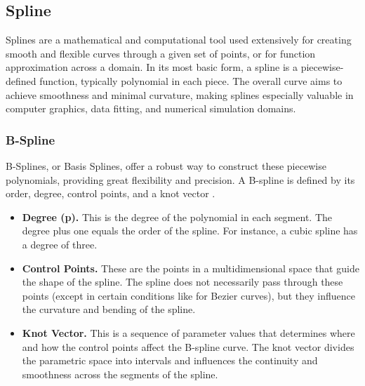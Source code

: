 \subsection{Spline}
Splines are a mathematical and computational tool used extensively for creating smooth and flexible curves through a given set of points, or for function approximation across a domain. In its most basic form, a spline is a piecewise-defined function, typically polynomial in each piece. The overall curve aims to achieve smoothness and minimal curvature, making splines especially valuable in computer graphics, data fitting, and numerical simulation domains.

\subsubsection{B-Spline}

B-Splines, or Basis Splines, offer a robust way to construct these piecewise polynomials,
providing great flexibility and precision.
A B-spline is defined by its order, degree, control points, and a knot vector \cite{allaire2008numerical}.
\begin{itemize}
\item \textbf{Degree (p).} This is the degree of the polynomial in each segment.
    The degree plus one equals the order of the spline.
    For instance, a cubic spline has a degree of three.
\item \textbf{Control Points.} These are the points in a multidimensional space that guide the shape of the spline.
    The spline does not necessarily pass through these points (except in certain conditions like for Bezier curves),
    but they influence the curvature and bending of the spline.
\item \textbf{Knot Vector.} This is a sequence of parameter values that determines where
    and how the control points affect the B-spline curve.
    The knot vector divides the parametric space into intervals
    and influences the continuity and smoothness across the segments of the spline.
\end{itemize}

